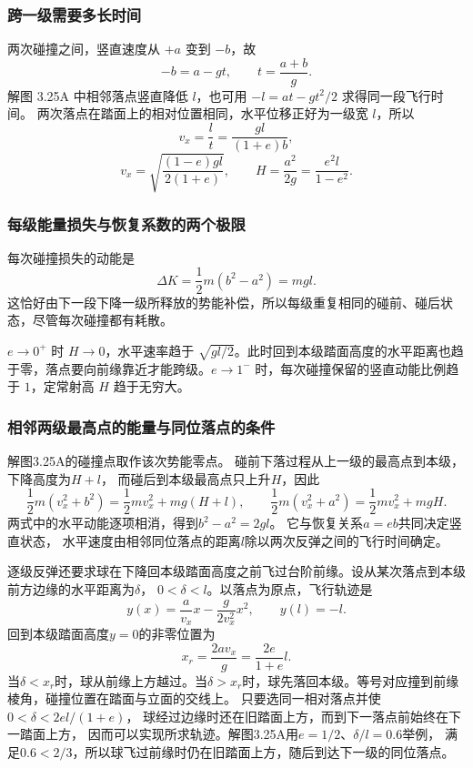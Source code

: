 \documentclass[UTF8,fontset=fandol,a4paper,11pt]{ctexart}
\begin{document}
\subsubsection*{跨一级需要多长时间}
两次碰撞之间，竖直速度从 $+a$ 变到 $-b$，故
\[
-b=a-gt,\qquad t=\frac{a+b}{g}.
\]
解图 3.25A 中相邻落点竖直降低 $l$，也可用
$-l=at-gt^2/2$ 求得同一段飞行时间。
两次落点在踏面上的相对位置相同，水平位移正好为一级宽 $l$，所以
\[
v_x=\frac{l}{t}=\frac{gl}{(1+e)b},
\]
\[
\boxed{v_x=\sqrt{\frac{(1-e)gl}{2(1+e)}}},\qquad
\boxed{H=\frac{a^2}{2g}=\frac{e^2l}{1-e^2}}.
\]

\subsubsection*{每级能量损失与恢复系数的两个极限}
每次碰撞损失的动能是
\[
\Delta K=\frac12m(b^2-a^2)=mgl.
\]
这恰好由下一段下降一级所释放的势能补偿，所以每级重复相同的碰前、碰后状态，尽管每次碰撞都有耗散。

$e\to0^+$ 时 $H\to0$，水平速率趋于 $\sqrt{gl/2}$。此时回到本级踏面高度的水平距离也趋于零，落点要向前缘靠近才能跨级。$e\to1^-$ 时，每次碰撞保留的竖直动能比例趋于 $1$，定常射高 $H$ 趋于无穷大。
\subsubsection*{相邻两级最高点的能量与同位落点的条件}
解图3.25A的碰撞点取作该次势能零点。
碰前下落过程从上一级的最高点到本级，下降高度为$H+l$，
而碰后到本级最高点只上升$H$，因此
\[
\frac12m(v_x^2+b^2)=\frac12mv_x^2+mg(H+l),\qquad
\frac12m(v_x^2+a^2)=\frac12mv_x^2+mgH.
\]
两式中的水平动能逐项相消，得到$b^2-a^2=2gl$。
它与恢复关系$a=eb$共同决定竖直状态，
水平速度由相邻同位落点的距离$l$除以两次反弹之间的飞行时间确定。

逐级反弹还要求球在下降回本级踏面高度之前飞过台阶前缘。设从某次落点到本级前方边缘的水平距离为$\delta$，
$0<\delta<l$。以落点为原点，飞行轨迹是
\[
y(x)=\frac{a}{v_x}x-\frac{g}{2v_x^2}x^2,
\qquad y(l)=-l.
\]
回到本级踏面高度$y=0$的非零位置为
\[
x_r=\frac{2av_x}{g}=\frac{2e}{1+e}l.
\]
当$\delta<x_r$时，球从前缘上方越过。当$\delta>x_r$时，球先落回本级。等号对应撞到前缘棱角，碰撞位置在踏面与立面的交线上。
只要选同一相对落点并使$0<\delta<2el/(1+e)$，
球经过边缘时还在旧踏面上方，而到下一落点前始终在下一踏面上方，
因而可以实现所求轨迹。解图3.25A用$e=1/2$、$\delta/l=0.6$举例，
满足$0.6<2/3$，所以球飞过前缘时仍在旧踏面上方，随后到达下一级的同位落点。



\end{document}

